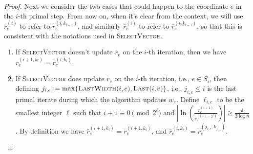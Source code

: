 \documentclass[11pt]{article}
\newcommand\rr{\boldsymbol{\mathit{r}}}
\newcommand\ww{\boldsymbol{\mathit{w}}}
\newcommand\rrbar{\overline{\boldsymbol{\mathit{r}}}}
\newcommand{\ov}{\overline}
\begin{document}
\begin{proof}
Next we consider the two cases that could happen to the coordinate $e$ in the $i$-th primal step. From now on, when it's clear from the context, we will use $\rr_e^{(i)}$ to refer to $\rr_e^{(i,k_{i-1})}$, and similarly $\rrbar_e^{(i)}$ to refer to $\rrbar_e^{(i,k_{i-1})}$, so that this is consistent with the notations used in \textsc{SelectVector}.
\begin{enumerate}
\item If \textsc{SelectVector} doesn't update $\ov{\rr}_e$ on the $i$-th iteration, then we have $\ov{\rr}^{(i+1,k_i)}_e = \ov{\rr}^{(i,k_i)}_e$. 
\item If \textsc{SelectVector} does update $\ov{\rr}_e$ on the $i$-th iteration, i.e., $e \in S_i$, then defining $j_{i,e} := \max\{\textsc{LastWidth}(i,e), \textsc{Last}(i,e)\}$, i.e., $j_{i,e} \leq i$ is the last primal iterate during which the algorithm updates $\ww_e$. Define $\ell_{i,e}$ to be the smallest integer $\ell$ such that $i+1 \equiv 0 \pmod{2^{\ell}}$ and $|\ln(\frac{\rr_e^{(i+1)}}{\rr_e^{(i+1-2^\ell)}})| \geq \frac{\delta}{2 \log n}$. 
By definition we have $\ov{\rr}^{(i+1,k_i)}_e = \rr^{(i+1,k_i)}_e$, and $\ov{\rr}^{(i,k_i)}_e = \rr^{(j_{i,e},k_{j_{i,e}})}_e$. 



\end{enumerate}
\end{proof}
\end{document}
